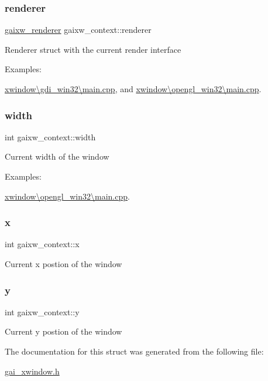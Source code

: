 \subsubsection{\texorpdfstring{renderer}{renderer}}
{\footnotesize\ttfamily \hyperlink{structgaixw__renderer}{gaixw\+\_\+renderer} gaixw\+\_\+context\+::renderer}

Renderer struct with the current render interface \begin{Desc}
\item[Examples\+: ]\par
\hyperlink{xwindow_0Cgdi_win32_0Cmain_8cpp-example}{xwindow\textbackslash{}gdi\+\_\+win32\textbackslash{}main.\+cpp}, and \hyperlink{xwindow_0Copengl_win32_0Cmain_8cpp-example}{xwindow\textbackslash{}opengl\+\_\+win32\textbackslash{}main.\+cpp}.\end{Desc}
\mbox{\label{structgaixw__context_a303c87d56adc742cf236b1ab00a7034b}} 
\subsubsection{\texorpdfstring{width}{width}}
{\footnotesize\ttfamily int gaixw\+\_\+context\+::width}

Current width of the window \begin{Desc}
\item[Examples\+: ]\par
\hyperlink{xwindow_0Copengl_win32_0Cmain_8cpp-example}{xwindow\textbackslash{}opengl\+\_\+win32\textbackslash{}main.\+cpp}.\end{Desc}
\mbox{\label{structgaixw__context_a562a7feb15e0c9e1aba48489b68529dc}} 
\subsubsection{\texorpdfstring{x}{x}}
{\footnotesize\ttfamily int gaixw\+\_\+context\+::x}

Current x postion of the window \mbox{\label{structgaixw__context_a8ae55e0362fe3112990d78e12a9e22c3}} 
\subsubsection{\texorpdfstring{y}{y}}
{\footnotesize\ttfamily int gaixw\+\_\+context\+::y}

Current y postion of the window 

The documentation for this struct was generated from the following file\+:\begin{DoxyCompactItemize}
\item 
\hyperlink{gai__xwindow_8h}{gai\+\_\+xwindow.\+h}\end{DoxyCompactItemize}
